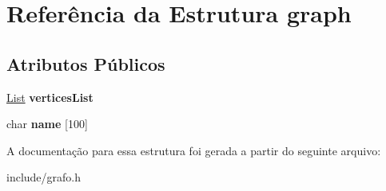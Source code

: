 \hypertarget{structgraph}{}\section{Referência da Estrutura graph}
\label{structgraph}
\subsection*{Atributos Públicos}
\begin{DoxyCompactItemize}
\item 
\mbox{\label{structgraph_a0ead4ec9235a10bc2f6cd453e508eac6}} 
\hyperlink{structlistNode}{List} {\bfseries vertices\+List}
\item 
\mbox{\label{structgraph_a1889833150d9fb8ca2618ad45b6bda43}} 
char {\bfseries name} \mbox{[}100\mbox{]}
\end{DoxyCompactItemize}


A documentação para essa estrutura foi gerada a partir do seguinte arquivo\+:\begin{DoxyCompactItemize}
\item 
include/grafo.\+h\end{DoxyCompactItemize}

